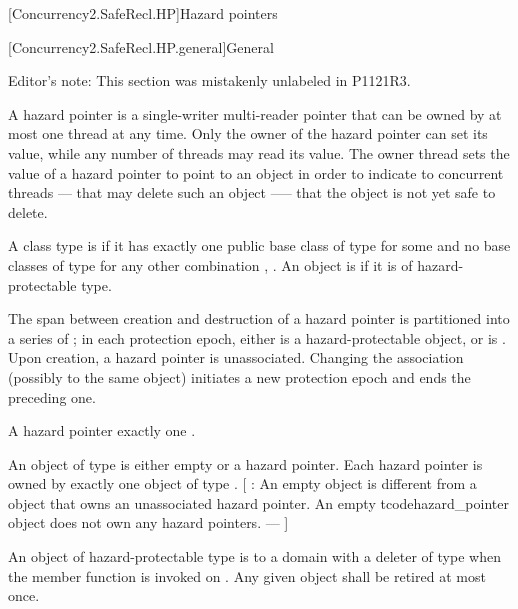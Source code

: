 
[Concurrency2.SafeRecl.HP]{Hazard pointers}

[Concurrency2.SafeRecl.HP.general]{General}

Editor's note: This section was mistakenly unlabeled in P1121R3.

\pnum
A hazard pointer is a single-writer multi-reader pointer that can be owned by at most one thread at any time. Only the owner of the hazard pointer can set its value, while any number of threads may read its value. The owner thread sets the value of a hazard pointer to point to an object in order to indicate to concurrent threads --- that may delete such an object --— that the object is not yet safe to delete.

\pnum
A class type  is  if it has exactly one public base class of type \linebreak {} for some  and no base classes of type  for any other combination , . An object is  if it is of hazard-protectable type.

\pnum
The span between creation and destruction of a hazard pointer  is partitioned into a series of ; in each protection epoch,  either is  a hazard-protectable object, or is . Upon creation, a hazard pointer is unassociated. Changing the association (possibly to the same object) initiates a new protection epoch and ends the preceding one.

\pnum
A hazard pointer  exactly one . 

\pnum
An object of type  is either empty or  a hazard pointer. Each hazard pointer is owned by exactly one object of type . [ : An empty  object is different from a  object that owns an unassociated hazard pointer. An empty tcode{hazard_pointer} object does not own any hazard pointers. ---  ]

\pnum
An object  of hazard-protectable type  is  to a domain with a deleter of type  when the member function  is invoked on . Any given object  shall be retired at most once.

